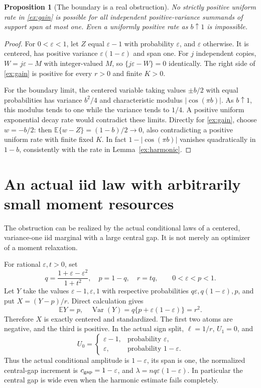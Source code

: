 \documentclass[11pt]{article}
\newcommand{\E}{\mathbb E}
\newtheorem{proposition}[lemma]{Proposition}
\begin{document}
\begin{proposition}[The boundary is a real obstruction]\label{ex:boundary}
No strictly positive uniform rate in \eqref{ex:gain} is possible for all
independent positive-variance summands of support span at most one.
Even a uniformly positive rate as $b\uparrow1$ is impossible.
\end{proposition}
\begin{proof}
For $0<\varepsilon<1$, let $Z$ equal $\varepsilon-1$ with probability
$\varepsilon$, and $\varepsilon$ otherwise. It is centered, has positive
variance $\varepsilon(1-\varepsilon)$ and span one.
For $j$ independent copies, $W=j\varepsilon-M$ with integer-valued
$M$, so $\{j\varepsilon-W\}=0$ identically. The right side of
\eqref{ex:gain} is positive for every $r>0$ and finite $K>0$.

For the boundary limit, the centered variable taking values $\pm b/2$
with equal probabilities has variance $b^2/4$ and characteristic modulus
$|\cos(\pi b)|$. As $b\uparrow1$, this modulus tends to one while the
variance tends to $1/4$. A positive uniform exponential decay rate would
contradict these limits. Directly for \eqref{ex:gain}, choose $w=-b/2$:
then $\E\{w-Z\}=(1-b)/2\to0$, also contradicting a positive uniform
rate with finite fixed $K$. In fact $1-|\cos(\pi b)|$ vanishes quadratically
in $1-b$, consistently with the rate in Lemma~\ref{ex:harmonic}.
\end{proof}

\section{An actual iid law with arbitrarily small moment resources}
The obstruction can be realized by the actual conditional laws of a
centered, variance-one iid marginal with a large central gap. It is not
merely an optimizer of a moment relaxation.

For rational $\varepsilon,t>0$, set
\begin{equation}\label{ex:family}
 q=\frac{1+\varepsilon-\varepsilon^2}{1+t^2},\quad
 p=1-q,\quad r=tq,
 \qquad 0<\varepsilon<p<1.
\end{equation}
Let $Y$ take the values $\varepsilon-1,\varepsilon,1$ with respective
probabilities $q\varepsilon,q(1-\varepsilon),p$, and put $X=(Y-p)/r$.
Direct calculation gives
\[
 \E Y=p,\quad
 \operatorname{Var}(Y)=q\{p+\varepsilon(1-\varepsilon)\}=r^2.
\]
Therefore $X$ is exactly centered and standardized. The first two atoms
are negative, and the third is positive. In the actual sign split,
$\ell=1/r$, $U_1=0$, and
\[
 U_0=\begin{cases}\varepsilon-1,&\text{probability }\varepsilon,\\
                  \varepsilon,&\text{probability }1-\varepsilon.
       \end{cases}
\]
Thus the actual conditional amplitude is $1-\varepsilon$, its span is
one, the normalized central-gap increment is $c_{\rm gap}=1-\varepsilon$,
and $\lambda=nq\varepsilon(1-\varepsilon)$.
In particular the central gap is wide even when the harmonic estimate
fails completely.
\end{document}
